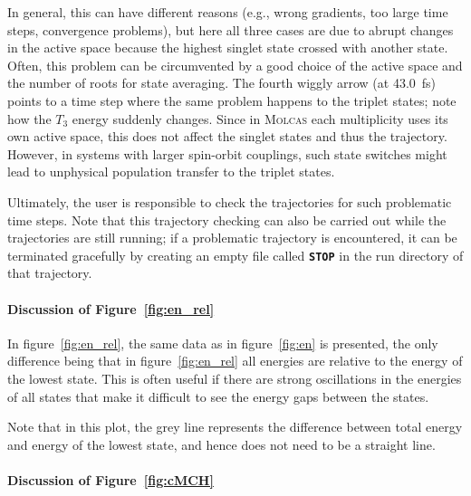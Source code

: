 \documentclass[a4paper,11pt,DIV=15,openany]{scrbook}
\newcommand{\ttt}[1]{\textbf{\texttt{#1}}}
\begin{document}
In general, this can have different reasons (e.g., wrong gradients, too large time steps, convergence problems), but here all three cases are due to abrupt changes in the active space because the highest singlet state crossed with another state.
Often, this problem can be circumvented by a good choice of the active space and the number of roots for state averaging.
The fourth wiggly arrow (at 43.0~fs) points to a time step where the same problem happens to the triplet states; note how the $T_3$ energy suddenly changes.
Since in \textsc{Molcas} each multiplicity uses its own active space, this does not affect the singlet states and thus the trajectory.
However, in systems with larger spin-orbit couplings, such state switches might lead to unphysical population transfer to the triplet states.

Ultimately, the user is responsible to check the trajectories for such problematic time steps.
Note that this trajectory checking can also be carried out while the trajectories are still running; if a problematic trajectory is encountered, it can be terminated gracefully by creating an empty file called \ttt{STOP} in the run directory of that trajectory.

\paragraph{Discussion of Figure~\ref{fig:en_rel}}

In figure~\ref{fig:en_rel}, the same data as in figure~\ref{fig:en} is presented, the only difference being that in figure~\ref{fig:en_rel} all energies are relative to the energy of the lowest state.
This is often useful if there are strong oscillations in the energies of all states that make it difficult to see the energy gaps between the states.

Note that in this plot, the grey line represents the difference between total energy and energy of the lowest state, and hence does not need to be a straight line.

\paragraph{Discussion of Figure~\ref{fig:cMCH}}
\end{document}
